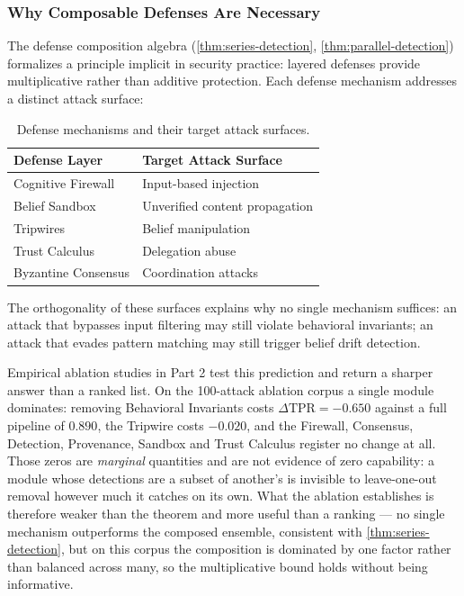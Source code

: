 \documentclass[
]{article}
\begin{document}
\subsubsection{Why Composable Defenses Are
Necessary}\label{why-composable-defenses-are-necessary}

The defense composition algebra (\cref{thm:series-detection},
\cref{thm:parallel-detection}) formalizes a principle implicit in
security practice: layered defenses provide multiplicative rather than
additive protection. Each defense mechanism addresses a distinct attack
surface:

\begin{table}[htbp]
\centering
\caption{Defense mechanisms and their target attack surfaces.}
\label{tab:defense-surfaces}
\begin{tabular}{@{}ll@{}}
\toprule
Defense Layer & Target Attack Surface \\
\midrule
Cognitive Firewall & Input-based injection \\
Belief Sandbox & Unverified content propagation \\
Tripwires & Belief manipulation \\
Trust Calculus & Delegation abuse \\
Byzantine Consensus & Coordination attacks \\
\bottomrule
\end{tabular}
\end{table}

The orthogonality of these surfaces explains why no single mechanism
suffices: an attack that bypasses input filtering may still violate
behavioral invariants; an attack that evades pattern matching may still
trigger belief drift detection.

Empirical ablation studies in Part 2 test this prediction and return a
sharper answer than a ranked list. On the 100-attack ablation corpus a
single module dominates: removing Behavioral Invariants costs
\(\Delta\text{TPR} = -0.650\) against a full pipeline of \(0.890\), the
Tripwire costs \(-0.020\), and the Firewall, Consensus, Detection,
Provenance, Sandbox and Trust Calculus register no change at all. Those
zeros are \emph{marginal} quantities and are not evidence of zero
capability: a module whose detections are a subset of another's is
invisible to leave-one-out removal however much it catches on its own.
What the ablation establishes is therefore weaker than the theorem and
more useful than a ranking --- no single mechanism outperforms the
composed ensemble, consistent with \cref{thm:series-detection}, but on
this corpus the composition is dominated by one factor rather than
balanced across many, so the multiplicative bound holds without being
informative.
\end{document}
